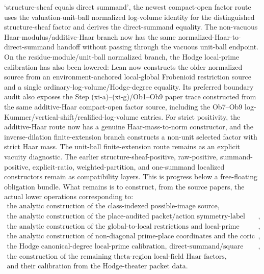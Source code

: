 \documentclass[11pt]{article}
\theoremstyle{plain}
\theoremstyle{definition}
\theoremstyle{remark}
\begin{document}
  `structure-sheaf equals direct summand', the newest compact-open factor route
  uses the valuation-unit-ball normalized log-volume identity for the
  distinguished structure-sheaf factor and derives the direct-summand equality.
	  The non-vacuous Haar-modulus/additive-Haar branch now has the same
	  normalized-Haar-to-direct-summand handoff without passing through the vacuous
	  unit-ball endpoint.  On the residue-module/unit-ball normalized branch, the
	  Hodge local-prime calibration has also been lowered: Lean now constructs the
	  older normalized source from an environment-anchored local-global
	  Frobenioid restriction source and a single ordinary-log-volume/Hodge-degree
	  equality.  Its preferred boundary audit also exposes the
	  Step (xi-a)--(xi-g)/Ob1--Ob9 paper trace constructed from the same
	  additive-Haar compact-open factor source, including the Ob7--Ob9
	  log-Kummer/vertical-shift/realified-log-volume entries.
For strict positivity, the additive-Haar route now has a genuine
Haar-mass-to-norm constructor, and the inverse-dilation finite-extension branch
constructs a non-unit selected factor with strict Haar mass.  The unit-ball
finite-extension route remains as an explicit vacuity diagnostic.  The earlier
structure-sheaf-positive, raw-positive, summand-positive,
explicit-ratio, weighted-partition, and one-summand localized constructors
remain as compatibility layers.
This is progress below a free-floating obligation bundle.  What remains is to
construct, from the source papers, the actual lower operations corresponding to:
\[
\begin{array}{l}
\text{the analytic construction of the class-indexed possible-image source},\\
\text{the analytic construction of the place-audited packet/action symmetry-label transport inputs},\\
\text{the analytic construction of the global-to-local restrictions and local-prime global equality},\\
\text{the analytic construction of non-diagonal prime-place coordinates and the coric character},\\
\text{the Hodge canonical-degree local-prime calibration, direct-summand/square determinant presentation, and pointwise determinant identities},\\
\text{the construction of the remaining theta-region local-field Haar factors},\\
\text{and their calibration from the Hodge-theater packet data}.
\end{array}
\]
\end{document}
